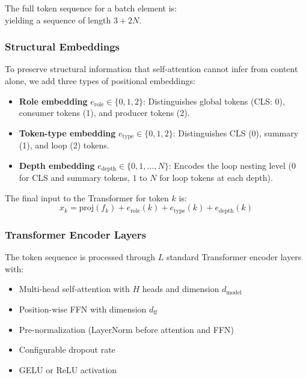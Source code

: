\documentclass[10pt,twocolumn]{article}
\begin{document}
The full token sequence for a batch element is:
\begin{equation}
[\text{CLS},\; \text{summary}_c,\; \text{summary}_p,\; \text{loop}_{c,0},\; \ldots,\; \text{loop}_{c,N-1},\; \text{loop}_{p,0},\; \ldots,\; \text{loop}_{p,N-1}]
\end{equation}
yielding a sequence of length $3 + 2N$.

\subsubsection{Structural Embeddings}

To preserve structural information that self-attention cannot infer from content alone, we add three types of positional embeddings:

\begin{itemize}
\item \textbf{Role embedding} $e_{\text{role}} \in \{0, 1, 2\}$: Distinguishes global tokens (CLS: 0), consumer tokens (1), and producer tokens (2).
\item \textbf{Token-type embedding} $e_{\text{type}} \in \{0, 1, 2\}$: Distinguishes CLS (0), summary (1), and loop (2) tokens.
\item \textbf{Depth embedding} $e_{\text{depth}} \in \{0, 1, \ldots, N\}$: Encodes the loop nesting level (0 for CLS and summary tokens, $1$ to $N$ for loop tokens at each depth).
\end{itemize}

The final input to the Transformer for token $k$ is:
\begin{equation}
x_k = \text{proj}(f_k) + e_{\text{role}}(k) + e_{\text{type}}(k) + e_{\text{depth}}(k)
\end{equation}

\subsubsection{Transformer Encoder Layers}

The token sequence is processed through $L$ standard Transformer encoder layers with:
\begin{itemize}
\item Multi-head self-attention with $H$ heads and dimension $d_{\text{model}}$
\item Position-wise FFN with dimension $d_{\text{ff}}$
\item Pre-normalization (LayerNorm before attention and FFN)
\item Configurable dropout rate
\item GELU or ReLU activation
\end{itemize}
\end{document}
